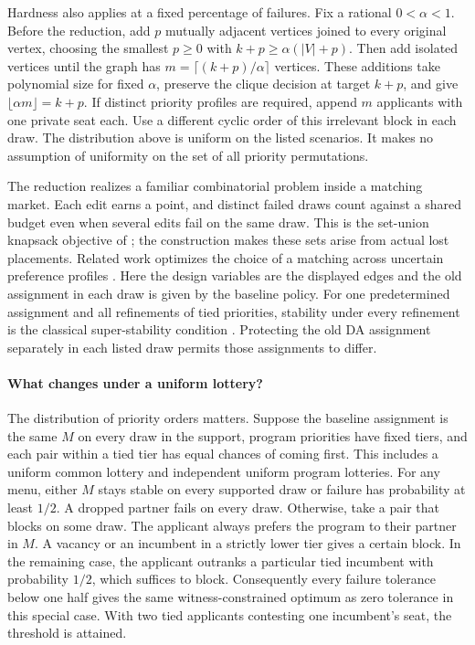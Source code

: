 Hardness also applies at a fixed percentage of failures. Fix a rational $0<\alpha<1$. Before the reduction, add $p$ mutually adjacent vertices joined to every original vertex, choosing the smallest $p\ge0$ with $k+p\ge\alpha(|V|+p)$. Then add isolated vertices until the graph has $m=\lceil (k+p)/\alpha\rceil$ vertices. These additions take polynomial size for fixed $\alpha$, preserve the clique decision at target $k+p$, and give $\lfloor\alpha m\rfloor=k+p$. If distinct priority profiles are required, append $m$ applicants with one private seat each. Use a different cyclic order of this irrelevant block in each draw. The distribution above is uniform on the listed scenarios. It makes no assumption of uniformity on the set of all priority permutations.

The reduction realizes a familiar combinatorial problem inside a matching market. Each edit earns a point, and distinct failed draws count against a shared budget even when several edits fail on the same draw. This is the set-union knapsack objective of \citet{setUnionKnapsack}; the construction makes these sets arise from actual lost placements. Related work optimizes the choice of a matching across uncertain preference profiles \citep{aziz_uncertain,chenMultimodal}. Here the design variables are the displayed edges and the old assignment in each draw is given by the baseline policy. For one predetermined assignment and all refinements of tied priorities, stability under every refinement is the classical super-stability condition \citep[Proposition~2]{irvingSuper}. Protecting the old DA assignment separately in each listed draw permits those assignments to differ.

\paragraph{What changes under a uniform lottery?}
The distribution of priority orders matters. Suppose the baseline assignment is the same $M$ on every draw in the support, program priorities have fixed tiers, and each pair within a tied tier has equal chances of coming first. This includes a uniform common lottery and independent uniform program lotteries. For any menu, either $M$ stays stable on every supported draw or failure has probability at least $1/2$. A dropped partner fails on every draw. Otherwise, take a pair that blocks on some draw. The applicant always prefers the program to their partner in $M$. A vacancy or an incumbent in a strictly lower tier gives a certain block. In the remaining case, the applicant outranks a particular tied incumbent with probability $1/2$, which suffices to block. Consequently every failure tolerance below one half gives the same witness-constrained optimum as zero tolerance in this special case. With two tied applicants contesting one incumbent's seat, the threshold is attained.

